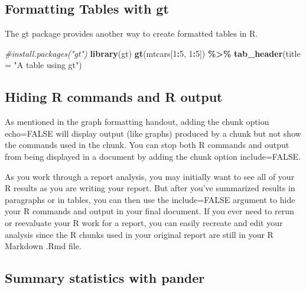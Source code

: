 \documentclass[
]{book}
\newenvironment{Shaded}{\begin{snugshade}}{\end{snugshade}}
\newcommand{\AttributeTok}[1]{\textcolor[rgb]{0.13,0.29,0.53}{#1}}
\newcommand{\CommentTok}[1]{\textcolor[rgb]{0.56,0.35,0.01}{\textit{#1}}}
\newcommand{\DecValTok}[1]{\textcolor[rgb]{0.00,0.00,0.81}{#1}}
\newcommand{\FunctionTok}[1]{\textcolor[rgb]{0.13,0.29,0.53}{\textbf{#1}}}
\newcommand{\NormalTok}[1]{#1}
\newcommand{\SpecialCharTok}[1]{\textcolor[rgb]{0.81,0.36,0.00}{\textbf{#1}}}
\newcommand{\StringTok}[1]{\textcolor[rgb]{0.31,0.60,0.02}{#1}}
\begin{document}
\hypertarget{formatting-tables-with-gt}{%
\subsection{Formatting Tables with gt}\label{formatting-tables-with-gt}}

The gt package provides another way to create formatted tables in R.

\begin{Shaded}
\begin{Highlighting}[]
\CommentTok{\#install.packages("gt")}
\FunctionTok{library}\NormalTok{(gt)}
\FunctionTok{gt}\NormalTok{(mtcars[}\DecValTok{1}\SpecialCharTok{:}\DecValTok{5}\NormalTok{, }\DecValTok{1}\SpecialCharTok{:}\DecValTok{5}\NormalTok{]) }\SpecialCharTok{\%\textgreater{}\%}
  \FunctionTok{tab\_header}\NormalTok{(}\AttributeTok{title =} \StringTok{"A table using gt"}\NormalTok{)}
\end{Highlighting}
\end{Shaded}

\hypertarget{hiding-r-commands-and-r-output}{%
\subsection{Hiding R commands and R output}\label{hiding-r-commands-and-r-output}}

As mentioned in the graph formatting handout, adding the chunk option echo=FALSE will display output (like graphs) produced by a chunk but not show the commands used in the chunk. You can stop both R commands and output from being displayed in a document by adding the chunk option include=FALSE.

As you work through a report analysis, you may initially want to see all of your R results as you are writing your report. But after you've summarized results in paragraphs or in tables, you can then use the include=FALSE argument to hide your R commands and output in your final document. If you ever need to rerun or reevaluate your R work for a report, you can easily recreate and edit your analysis since the R chunks used in your original report are still in your R Markdown .Rmd file.

\hypertarget{summary-statistics-with-pander}{%
\subsection{Summary statistics with pander}\label{summary-statistics-with-pander}}
\end{document}

